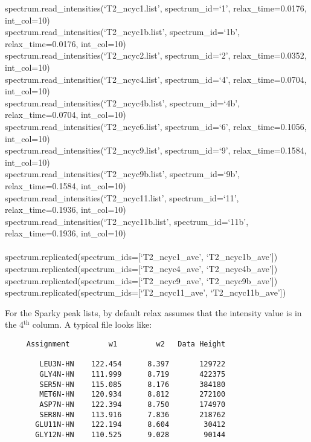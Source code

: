 \begin{exampleenv}
spectrum.read\_intensities(`T2\_ncyc1.list',   spectrum\_id=`1',   relax\_time=0.0176, int\_col=10) \\
spectrum.read\_intensities(`T2\_ncyc1b.list',  spectrum\_id=`1b',  relax\_time=0.0176, int\_col=10) \\
spectrum.read\_intensities(`T2\_ncyc2.list',   spectrum\_id=`2',   relax\_time=0.0352, int\_col=10) \\
spectrum.read\_intensities(`T2\_ncyc4.list',   spectrum\_id=`4',   relax\_time=0.0704, int\_col=10) \\
spectrum.read\_intensities(`T2\_ncyc4b.list',  spectrum\_id=`4b',  relax\_time=0.0704, int\_col=10) \\
spectrum.read\_intensities(`T2\_ncyc6.list',   spectrum\_id=`6',   relax\_time=0.1056, int\_col=10) \\
spectrum.read\_intensities(`T2\_ncyc9.list',   spectrum\_id=`9',   relax\_time=0.1584, int\_col=10) \\
spectrum.read\_intensities(`T2\_ncyc9b.list',  spectrum\_id=`9b',  relax\_time=0.1584, int\_col=10) \\
spectrum.read\_intensities(`T2\_ncyc11.list',  spectrum\_id=`11',  relax\_time=0.1936, int\_col=10) \\
spectrum.read\_intensities(`T2\_ncyc11b.list', spectrum\_id=`11b', relax\_time=0.1936, int\_col=10) \\
 \\
spectrum.replicated(spectrum\_ids=[`T2\_ncyc1\_ave', `T2\_ncyc1b\_ave']) \\
spectrum.replicated(spectrum\_ids=[`T2\_ncyc4\_ave', `T2\_ncyc4b\_ave']) \\
spectrum.replicated(spectrum\_ids=[`T2\_ncyc9\_ave', `T2\_ncyc9b\_ave']) \\
spectrum.replicated(spectrum\_ids=[`T2\_ncyc11\_ave', `T2\_ncyc11b\_ave'])
\end{exampleenv}

For the Sparky peak lists, by default relax assumes that the intensity value is in the 4$^\textrm{th}$ column.  A typical file looks like:

{\scriptsize \begin{verbatim}
     Assignment         w1         w2   Data Height

        LEU3N-HN    122.454      8.397       129722
        GLY4N-HN    111.999      8.719       422375
        SER5N-HN    115.085      8.176       384180
        MET6N-HN    120.934      8.812       272100
        ASP7N-HN    122.394      8.750       174970
        SER8N-HN    113.916      7.836       218762
       GLU11N-HN    122.194      8.604        30412
       GLY12N-HN    110.525      9.028        90144
\end{verbatim}}

